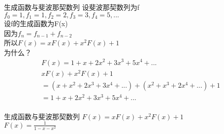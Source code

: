 \documentclass{beamer}
\begin{document}
\begin{frame}{生成函数与斐波那契数列}
设斐波那契数列为f\\
$f_0=1,f_1=1,f_2=2,f_3=3,f_4=5,...$\\
设f的生成函数为F(x)\\
\pause
因为$f_n=f_{n-1}+f_{n-2}$\\
所以$F(x)=xF(x)+x^2F(x)+1$\\
为什么？\\
\pause
$$
\begin{aligned}
&F(x)=1+x+2x^2+3x^3+5x^4+...\\
&xF(x)+x^2F(x)+1\\
&=(x+x^2+2x^3+3x^4+...)+(x^2+x^3+2x^4+...)+1\\
&=1+x+2x^2+3x^3+5x^4+...\\
\end{aligned}
$$
\end{frame}

\begin{frame}{生成函数与斐波那契数列}
$F(x)=xF(x)+x^2F(x)+1$\\
$F(x)=\frac{1}{1-x-x^2}$
\end{frame}
\end{document}

